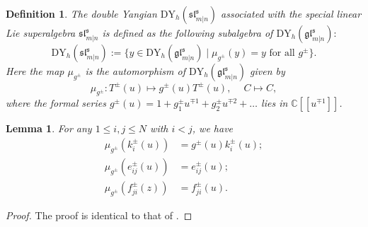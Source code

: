 \documentclass[a4paper,12pt]{article}
\newtheorem{lemm}[theo]{Lemma}
\newtheorem{defi}[theo]{Definition}
\numberwithin{equation}{section}
\begin{document}
\begin{defi}
The double Yangian $\mathrm{DY}_{h}(\mathfrak{sl}^{\mathfrak{s}}_{m|n})$ associated with the special linear Lie superalgebra $\mathfrak{sl}^{\mathfrak{s}}_{m|n}$ is defined as the following subalgebra of $\mathrm{DY}_{h}(\mathfrak{gl}^{\mathfrak{s}}_{m|n}):$
$$
\mathrm{DY}_{h}(\mathfrak{sl}^{\mathfrak{s}}_{m|n}):=\{y\in \mathrm{DY}_{h}(\mathfrak{gl}^{\mathfrak{s}}_{m|n})\mid \mu_{g^{\pm}}(y)=y \text{ for all } g^{\pm}\}.
$$
Here the map $\mu_{g^{\pm}}$ is the automorphism of $\mathrm{DY}_{h}(\mathfrak{gl}^{\mathfrak{s}}_{m|n})$ given by
$$
\mu_{g^{\pm}}: T^{\pm}(u)\mapsto g^{\pm}(u)T^{\pm}(u),\quad~C\mapsto C,
$$
where the formal series $g^{\pm}(u)=1+g_{1}^{\pm}u^{\mp 1}+g_{2}^{\pm}u^{\mp 2}+\ldots$ lies in $\mathbb{C}[[u^{\mp 1}]]$.
\end{defi}

\begin{lemm}\label{mug_action}
For any $1\leqslant i, j\leqslant N$ with $i<j$, we have
\begin{align}\label{ki}
\mu_{g^{\pm}}(k_{i}^{\pm}(u))&=g^{\pm}(u)k_{i}^{\pm}(u);\\
\mu_{g^{\pm}}(e_{ij}^{\pm}(u))&=e_{ij}^{\pm}(u);\\ \label{fij}
\mu_{g^{\pm}}(f_{ji}^{\pm}(z))&=f_{ji}^{\pm}(u).
\end{align}
\end{lemm}
\begin{proof}
The proof is identical to that of \cite[Lemma 4.4]{XLZ}.
\end{proof}
\end{document}
